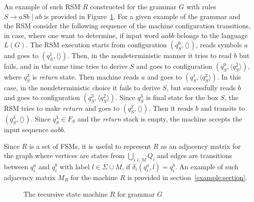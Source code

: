 An example of such RSM $R$ constructed for the grammar $G$ with rules $S \to a S b \mid a b$ is provided in Figure~\ref{example:automata}. 
For a given example of the grammar and the RSM consider the following sequence of the machine configuration transitions, in case, where one want to determine, if input word $aabb$ belongs to the language $L(G)$. 
The RSM execution starts from configuration $(q_S^0,\langle \rangle)$, reads symbols $a$ and goes to $(q_S^1, \langle \rangle)$. 
Then, in the nondeterministic manner it tries to read $b$ but fails, and in the same time tries to derive $S$ and goes to configuration $(q_S^0, \langle q_S^2 \rangle)$, where $q_S^2$ is \textit{return} state. 
Then machine reads $a$ and goes to $(q_S^1, \langle q_S^2 \rangle)$. In this case, in the nondeterministic choice it fails to derive $S$, but successfully reads $b$ and goes to configuration $(q_S^3,\langle q_S^2 \rangle)$. 
Since $q_S^3$ is final state for the box $S$, the RSM tries to make $return$ and goes to $(q_S^2,\langle \rangle)$. 
Then it reads $b$ and transits to $(q_S^3,\langle \rangle)$. 
Since $q_S^3 \in F_S$ and the \textit{return} stack is empty, the machine accepts the input sequence $aabb$.

Since $R$ is a set of FSMs, it is useful to represent $R$ as an adjacency matrix for the graph where vertices are states from $\bigcup_{i \in M}Q_i$ and edges are transitions between $q_i^a$ and $q_i^b$ with label $l \in \Sigma \cup M$, if $\delta_i (q_i^a, l) = q_i^b$.
An example of such adjacency matrix $M_R$ for the machine $R$ is provided in section~\ref{example:section}.

\begin{figure}[h]
    \centering
    \caption{The recursive state machine $R$ for grammar $G$}
    \label{example:automata}
\end{figure}



